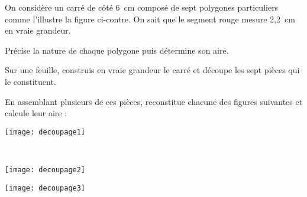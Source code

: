 
\begin{activite}[Découpages]

\begin{minipage}[c]{0.76\linewidth}
On considère un carré de côté 6 cm composé de sept polygones particuliers comme l'illustre la figure ci-contre. On sait que le segment rouge mesure 2,2 cm en vraie grandeur.

\begin{partie}
Précise la nature de chaque polygone puis détermine son aire.
\end{partie}

\begin{partie}
Sur une feuille, construis en vraie grandeur le carré et découpe les sept pièces qui le constituent.
\end{partie}

\begin{partie}
En assemblant plusieurs de ces pièces, reconstitue chacune des figures suivantes et calcule leur aire :
 \end{partie}
 \end{minipage} \hfill%
 \begin{minipage}[c]{0.2\linewidth}
  \texttt{[image: decoupage1]}
  \end{minipage} \\
  \begin{colenumerate}{2}
   \item
   
   \texttt{[image: decoupage2]}
   \item
   
   \texttt{[image: decoupage3]}
   \end{colenumerate}

\end{activite}


